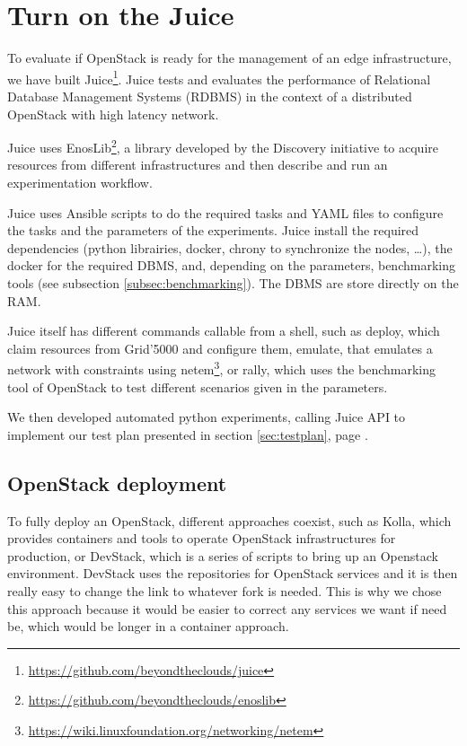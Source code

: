 \section{Turn on the Juice}


To evaluate if OpenStack is ready for the management of an edge infrastructure, we have built Juice\footnote{\url{https://github.com/beyondtheclouds/juice}}. Juice tests and evaluates the performance of Relational Database Management Systems (RDBMS) in the context of a distributed OpenStack with high latency network.

Juice uses EnosLib\footnote{\url{https://github.com/beyondtheclouds/enoslib}}, a library developed by the Discovery initiative to acquire resources from different infrastructures and then describe and run an experimentation workflow.

Juice uses Ansible scripts to do the required tasks and YAML files to configure the tasks and the parameters of the experiments. Juice install the required dependencies (python librairies, docker, chrony to synchronize the nodes, \dots), the docker for the required DBMS, and, depending on the parameters, benchmarking tools (see subsection \ref{subsec:benchmarking}). The DBMS are store directly on the RAM.

Juice itself has different commands callable from a shell, such as deploy, which claim resources from Grid'5000 and configure them, emulate, that emulates a network with constraints using netem\footnote{\url{https://wiki.linuxfoundation.org/networking/netem}}, or rally, which uses the benchmarking tool of OpenStack to test different scenarios given in the parameters.

We then developed automated python experiments, calling Juice API to implement our test plan presented in section \ref{sec:testplan}, page \pageref{sec:testplan}.

\subsection{OpenStack deployment}

To fully deploy an OpenStack, different approaches coexist, such as Kolla, which provides containers and tools to operate OpenStack infrastructures for production, or DevStack, which is a series of scripts to bring up an Openstack environment. DevStack uses the repositories for OpenStack services and it is then really easy to change the link to whatever fork is needed. This is why we chose this approach because it would be easier to correct any services we want if need be, which would be longer in a container approach.

